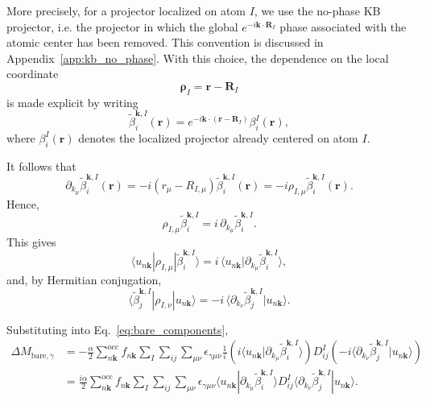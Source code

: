 \documentclass[11pt]{article}
\begin{document}
More precisely, for a projector localized on atom $I$, we use the
no-phase KB projector, i.e. the projector in which the global
$e^{-i\mathbf{k}\cdot\mathbf{R}_I}$ phase associated with the atomic
center has been removed. This convention is discussed in
Appendix~\ref{app:kb_no_phase}. With this choice, the dependence on the
local coordinate
\begin{equation}
\boldsymbol{\rho}_I = \mathbf r-\mathbf R_I
\end{equation}
is made explicit by writing
\begin{equation}
\widetilde{\beta}_i^{\mathbf{k},I}(\mathbf{r})
=
e^{-i\mathbf{k}\cdot(\mathbf{r}-\mathbf{R}_I)}
\beta_i^{I}(\mathbf{r}),
\end{equation}
where $\beta_i^{I}(\mathbf r)$ denotes the localized projector already
centered on atom $I$.

It follows that
\begin{equation}
\partial_{k_\mu}\widetilde{\beta}_i^{\mathbf{k},I}(\mathbf{r})
=
-i (r_\mu-R_{I,\mu})
\widetilde{\beta}_i^{\mathbf{k},I}(\mathbf{r})
=
-i \rho_{I,\mu}
\widetilde{\beta}_i^{\mathbf{k},I}(\mathbf{r}).
\end{equation}
Hence,
\begin{equation}
\rho_{I,\mu}\widetilde{\beta}_i^{\mathbf{k},I}
=
i\,\partial_{k_\mu}\widetilde{\beta}_i^{\mathbf{k},I}.
\label{eq:rho_beta_ket}
\end{equation}
This gives
\begin{equation}
\langle u_{n\mathbf{k}} | \rho_{I,\mu} |
\widetilde{\beta}_i^{\mathbf{k},I} \rangle
=
i \,
\langle u_{n\mathbf{k}} |
\partial_{k_\mu} \widetilde{\beta}_i^{\mathbf{k},I} \rangle ,
\label{eq:rho_beta_left}
\end{equation}
and, by Hermitian conjugation,
\begin{equation}
\langle \widetilde{\beta}_j^{\mathbf{k},I} |
\rho_{I,\nu} | u_{n\mathbf{k}} \rangle
=
- i \,
\langle
\partial_{k_\nu} \widetilde{\beta}_j^{\mathbf{k},I}
| u_{n\mathbf{k}} \rangle .
\label{eq:rho_beta_right}
\end{equation}



Substituting into Eq.~\eqref{eq:bare_components},
\begin{align}
\Delta M_{\mathrm{bare},\gamma}
&=
-\frac{\alpha}{2}
\sum_{n\mathbf{k}}^{\mathrm{occ}} f_{n\mathbf{k}}
\sum_I \sum_{ij} \sum_{\mu\nu}
\epsilon_{\gamma\mu\nu}
\frac{1}{i}
\left(
i \langle u_{n\mathbf{k}} | \partial_{k_\mu}
\widetilde{\beta}_i^{\mathbf{k},I} \rangle
\right)
D_{ij}^I
\left(
- i \langle \partial_{k_\nu}
\widetilde{\beta}_j^{\mathbf{k},I} | u_{n\mathbf{k}} \rangle
\right)
\nonumber\\
&=
\frac{i\alpha}{2}
\sum_{n\mathbf{k}}^{\mathrm{occ}} f_{n\mathbf{k}}
\sum_I \sum_{ij} \sum_{\mu\nu}
\epsilon_{\gamma\mu\nu}
\langle u_{n\mathbf{k}} | \partial_{k_\mu}
\widetilde{\beta}_i^{\mathbf{k},I} \rangle
D_{ij}^I
\langle \partial_{k_\nu}
\widetilde{\beta}_j^{\mathbf{k},I} | u_{n\mathbf{k}} \rangle .
\label{eq:bare_before_im}
\end{align}
\end{document}
